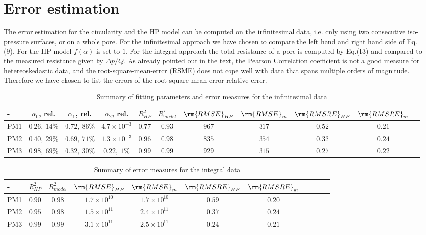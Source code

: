\documentclass[draft,jgrga]{agutexSI2019}
\begin{document}
\section{Error estimation}
The error estimation for the circularity and the HP model can be computed on the infinitesimal data, i.e. only using two consecutive iso-pressure surfaces, or on a whole pore. For the infinitesimal approach we have chosen to compare the left hand and right hand side of Eq.(9). For the HP model $f(\alpha)$ is set to $1$. For the integral approach the total resistance of a pore is computed by Eq.(13) and compared to the measured resistance given by $\Delta p/Q$. As already pointed out in the text, the Pearson Correlation coefficient is not a good measure for hetereoskedastic data, and the root-square-mean-error (RSME) does not cope well with data that spans multiple orders of magnitude. Therefore we have chosen to list the errors of the root-square-mean-error-relative error. 




\begin{table}[htbp!]
\caption{Summary of fitting parameters and error measures for the infinitesimal data}
\begin{tabular}{l|c|c|c|c|c|c|c|c|c|c}
- & $\alpha_0$, rel. & $\alpha_1$, rel. & $\alpha_2$, rel. &$R^2_{HP}$ &$R^2_{model}$ &$\rm{RMSE}_{HP}$ &$\rm{RMSE}_{m}$ & $\rm{RMSRE}_{HP}$ & $\rm{RMSRE}_{m}$ \\
\hline
PM1 	& $0.26,~14\%$ 	& $0.72,~86\%$ 	& $4.7\times 10^{-3}$ 	& $0.77$ 	& $0.93$ & $967$ & $317$ & $0.52$ & $0.21$ \\
PM2 	& $0.40,~29\%$ 	& $0.69,~71\%$ 	& $1.3 \times 10^{-3}$ 	& $0.96$	& $0.98$ & $835$ & $354$ & $0.33$ & $0.24$\\
PM3 	& $0.98,~69\%$ 	& $0.32,~30\%$ 	& $0.22,~1\%$ 			& $0.99$	& $0.99$ & $929$ & $315$ & $0.27$ & $0.22$\\
\end{tabular}
\label{tab:rmse_infi}

\end{table}

\begin{table}[htbp!]
\caption{Summary of error measures for the integral data}

\begin{tabular}{l|c|c|c|c|c|c|c|c|c|c}
- &  $R^2_{HP}$ &$R^2_{model}$ &$\rm{RMSE}_{HP}$ &$\rm{RMSE}_{m}$ & $\rm{RMSRE}_{HP}$ & $\rm{RMSRE}_{m}$ \\
\hline
PM1 	& $0.90$ & $0.98$ & $1.7\times 10^{10}$ & $1.7\times 10^{10}$ & $0.59$ & $0.20$ \\
PM2 	& $0.95$ & $0.98$ & $1.5\times 10^{11}$ & $2.4\times 10^{11}$ & $0.37$ & $0.24$\\
PM3 	& $0.99$ & $0.99$ & $3.1\times 10^{11}$ & $2.5\times 10^{11}$ & $0.24$ & $0.21$\\
\end{tabular}
\label{tab:rmse_integral}

\end{table}
\end{document}
